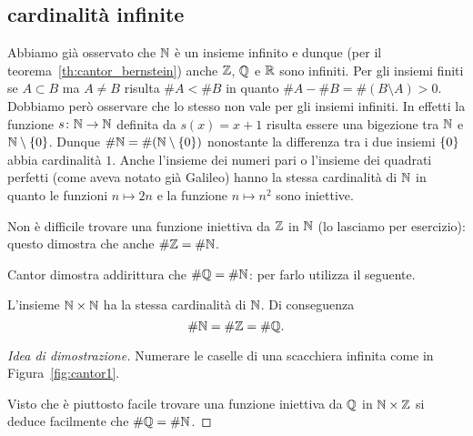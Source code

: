\subsection{cardinalità infinite}
\label{sec:cardinali_infiniti}

Abbiamo già osservato che ${\mathbb N}$ è un insieme infinito e dunque (per il teorema~\ref{th:cantor_bernstein})
anche ${\mathbb Z}$, ${\mathbb Q}$ e ${\mathbb R}$ sono infiniti.
Per gli insiemi finiti se $A\subset B$ ma $A\neq B$ risulta $\#A < \# B$
in quanto $\#A - \#B = \#(B\setminus A) > 0$. 
Dobbiamo però osservare che lo stesso non vale per gli insiemi infiniti.
In effetti la funzione $s\colon {\mathbb N} \to {\mathbb N}$ definita da $s(x)=x+1$
risulta essere una bigezione tra ${\mathbb N}$ e ${\mathbb N}\setminus{\left\{ 0 \right\}}$. 
Dunque $\#{\mathbb N} = \#({\mathbb N}\setminus{\left\{ 0 \right\}})$ 
nonostante la differenza tra i due insiemi ${\left\{ 0 \right\}}$ abbia 
cardinalità $1$. 
Anche l'insieme dei numeri pari o l'insieme 
dei quadrati perfetti (come aveva notato già Galileo)
hanno la stessa cardinalità di ${\mathbb N}$ in quanto le funzioni $n\mapsto 2n$
e la funzione $n\mapsto n^2$ sono iniettive.

Non è difficile trovare una funzione iniettiva da ${\mathbb Z}$ in ${\mathbb N}$
(lo lasciamo per esercizio): questo dimostra che anche $\#{\mathbb Z} = \# {\mathbb N}$.

Cantor dimostra addirittura che $\#{\mathbb Q} = \#{\mathbb N}$: per farlo utilizza il seguente.

\begin{theorem}
\label{th:Cantor_primo}%
%
L'insieme ${\mathbb N} \times {\mathbb N}$ ha la stessa cardinalità di ${\mathbb N}$. Di conseguenza
\[
  \# {\mathbb N} = \# {\mathbb Z} = \# {\mathbb Q}.
  \]
\end{theorem}
%
\begin{proof}[Idea di dimostrazione]
  Numerare le caselle di una scacchiera infinita
  come in Figura~\ref{fig:cantor1}.
  
  Visto che è piuttosto facile trovare una funzione iniettiva 
  da ${\mathbb Q}$ in ${\mathbb N} \times {\mathbb Z}$ si deduce facilmente che $\#{\mathbb Q} = \#{\mathbb N}$.
\end{proof}


